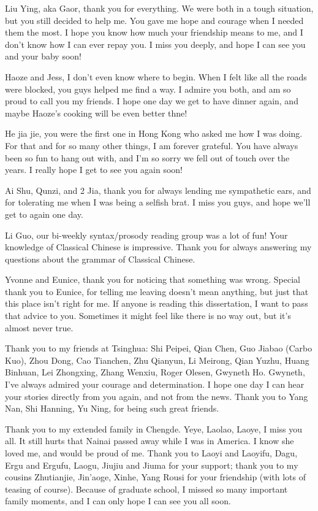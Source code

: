 Liu Ying, aka Gaor, thank you for everything. We were both in a tough situation, but you still decided to help me. You gave me hope and courage when I needed them the most. I hope you know how much your friendship means to me, and I don’t know how I can ever repay you. I miss you deeply, and hope I can see you and your baby soon!
 
Haoze and Jess, I don’t even know where to begin. When I felt like all the roads were blocked, you guys helped me find a way. I admire you both, and am so proud to call you my friends. I hope one day we get to have dinner again, and maybe Haoze’s cooking will be even better thne!
 
He jia jie, you were the first one in Hong Kong who asked me how I was doing. For that and for so many other things, I am forever grateful. You have always been so fun to hang out with, and I’m so sorry we fell out of touch over the years. I really hope I get to see you again soon!
 
Ai Shu, Qunzi, and 2 Jia, thank you for always lending me sympathetic ears, and for tolerating me when I was being a selfish brat. I miss you guys, and hope we’ll get to  again one day.

Li Guo, our bi-weekly syntax/prosody reading group was a lot of fun! Your knowledge of Classical Chinese is impressive. Thank you for always answering my questions about the grammar of Classical Chinese.
 
Yvonne and Eunice, thank you for noticing that something was wrong. Special thank you to Eunice, for telling me leaving doesn’t mean anything, but just that this place isn’t right for me. If anyone is reading this dissertation, I want to pass that advice to you. Sometimes it might feel like there is no way out, but it's almost never true. 
 
Thank you to my friends at Tsinghua: Shi Peipei, Qian Chen, Guo Jiabao (Carbo Kuo), Zhou Dong, Cao Tianchen, Zhu Qianyun, Li Meirong, Qian Yuzhu, Huang Binhuan, Lei Zhongxing, Zhang Wenxiu, Roger Olesen, Gwyneth Ho. Gwyneth, I’ve always admired your courage and determination. I hope one day I can hear your stories directly from you again, and not from the news. Thank you to Yang Nan, Shi Hanning, Yu Ning, for being such great friends.

Thank you to my extended family in Chengde. Yeye, Laolao, Laoye, I miss you all. It still hurts that Nainai passed away while I was in America. I know she loved me, and would be proud of me. Thank you to Laoyi and Laoyifu, Dagu, Ergu and Ergufu, Laogu, Jiujiu and Jiuma for your support; thank you to my cousins Zhutianjie, Jin'aoge, Xinhe, Yang Rousi for your friendship (with lots of teasing of course). Because of graduate school, I missed so many important family moments, and I can only hope I can see you all soon. 


